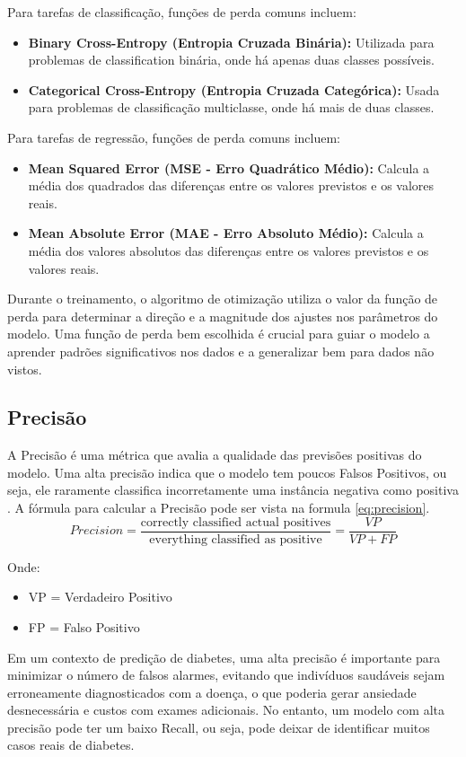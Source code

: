Para tarefas de classificação, funções de perda comuns incluem:
\begin{itemize}
    \item \textbf{Binary Cross-Entropy (Entropia Cruzada Binária):} Utilizada para problemas de classification binária, onde há apenas duas classes possíveis.
    \item \textbf{Categorical Cross-Entropy (Entropia Cruzada Categórica):} Usada para problemas de classificação multiclasse, onde há mais de duas classes.
\end{itemize}

Para tarefas de regressão, funções de perda comuns incluem:
\begin{itemize}
    \item \textbf{Mean Squared Error (MSE - Erro Quadrático Médio):} Calcula a média dos quadrados das diferenças entre os valores previstos e os valores reais.
    \item \textbf{Mean Absolute Error (MAE - Erro Absoluto Médio):} Calcula a média dos valores absolutos das diferenças entre os valores previstos e os valores reais.
\end{itemize}
Durante o treinamento, o algoritmo de otimização utiliza o valor da função de perda para determinar a direção e a magnitude dos ajustes nos parâmetros do modelo. Uma função de perda bem escolhida é crucial para guiar o modelo a aprender padrões significativos nos dados e a generalizar bem para dados não vistos.

\subsection{Precisão}
A Precisão é uma métrica que avalia a qualidade das previsões positivas do modelo. Uma alta precisão indica que o modelo tem poucos Falsos Positivos, ou seja, ele raramente classifica incorretamente uma instância negativa como positiva \cite{Freitas2024}.
A fórmula para calcular a Precisão pode ser vista na formula \ref{eq:precision}.
\begin{equation}
    Precision =\frac{\text{correctly classified actual positives}}{\text{everything classified as positive}} = \frac{VP}{VP+FP} 
    \label{eq:precision}
\end{equation}

Onde:
\begin{itemize}
    \item VP = Verdadeiro Positivo
    \item FP = Falso Positivo
\end{itemize}
Em um contexto de predição de diabetes, uma alta precisão é importante para minimizar o número de falsos alarmes, evitando que indivíduos saudáveis sejam erroneamente diagnosticados com a doença, o que poderia gerar ansiedade desnecessária e custos com exames adicionais. No entanto, um modelo com alta precisão pode ter um baixo Recall, ou seja, pode deixar de identificar muitos casos reais de diabetes.

